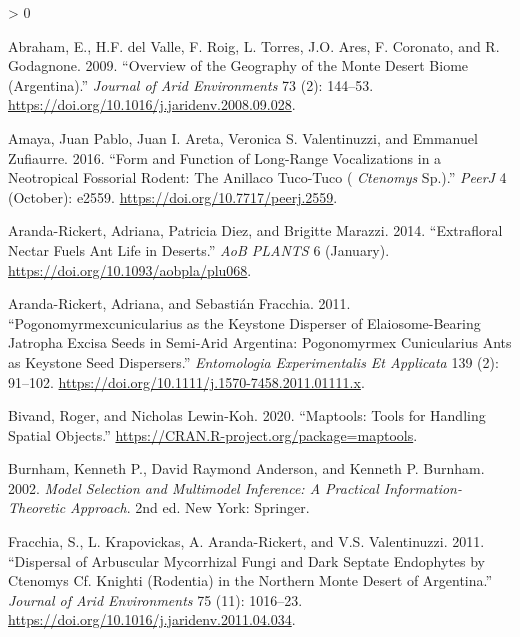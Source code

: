 \documentclass[english,msc,numbers,hidelinks]{coppe}
\newlength{\cslhangindent}
\newenvironment{CSLReferences}[2] %
 {%
  \setlength{\parindent}{0pt}
  \ifodd #1 \everypar{\setlength{\hangindent}{\cslhangindent}}\ignorespaces\fi
  \ifnum #2 > 0
  \setlength{\parskip}{#2\baselineskip}
  \fi
 }%
 {}
\begin{document}
  \noindent

  \setlength{\parindent}{-0.20in}
  \setlength{\leftskip}{0.20in}
  \setlength{\parskip}{8pt}

  \hypertarget{refs}{}
  \begin{CSLReferences}{1}{0}
  \leavevmode\hypertarget{ref-abraham2009}{}%
  Abraham, E., H.F. del Valle, F. Roig, L. Torres, J.O. Ares, F. Coronato, and R. Godagnone. 2009. {``Overview of the Geography of the Monte Desert Biome (Argentina).''} \emph{Journal of Arid Environments} 73 (2): 144--53. \url{https://doi.org/10.1016/j.jaridenv.2008.09.028}.

  \leavevmode\hypertarget{ref-amaya2016}{}%
  Amaya, Juan Pablo, Juan I. Areta, Veronica S. Valentinuzzi, and Emmanuel Zufiaurre. 2016. {``Form and Function of Long-Range Vocalizations in a Neotropical Fossorial Rodent: The Anillaco Tuco-Tuco ( {\emph{Ctenomys}} Sp.).''} \emph{PeerJ} 4 (October): e2559. \url{https://doi.org/10.7717/peerj.2559}.

  \leavevmode\hypertarget{ref-aranda-rickert2014}{}%
  Aranda-Rickert, Adriana, Patricia Diez, and Brigitte Marazzi. 2014. {``Extrafloral Nectar Fuels Ant Life in Deserts.''} \emph{AoB PLANTS} 6 (January). \url{https://doi.org/10.1093/aobpla/plu068}.

  \leavevmode\hypertarget{ref-aranda-rickert2011a}{}%
  Aranda-Rickert, Adriana, and Sebastián Fracchia. 2011. {``Pogonomyrmexcunicularius as the Keystone Disperser of Elaiosome-Bearing Jatropha Excisa Seeds in Semi-Arid Argentina: Pogonomyrmex Cunicularius Ants as Keystone Seed Dispersers.''} \emph{Entomologia Experimentalis Et Applicata} 139 (2): 91--102. \url{https://doi.org/10.1111/j.1570-7458.2011.01111.x}.

  \leavevmode\hypertarget{ref-bivand2020}{}%
  Bivand, Roger, and Nicholas Lewin-Koh. 2020. {``Maptools: Tools for Handling Spatial Objects.''} \url{https://CRAN.R-project.org/package=maptools}.

  \leavevmode\hypertarget{ref-burnham2002}{}%
  Burnham, Kenneth P., David Raymond Anderson, and Kenneth P. Burnham. 2002. \emph{Model Selection and Multimodel Inference: A Practical Information-Theoretic Approach}. 2nd ed. New York: Springer.

  \leavevmode\hypertarget{ref-fracchia2011}{}%
  Fracchia, S., L. Krapovickas, A. Aranda-Rickert, and V.S. Valentinuzzi. 2011. {``Dispersal of Arbuscular Mycorrhizal Fungi and Dark Septate Endophytes by Ctenomys Cf. Knighti (Rodentia) in the Northern Monte Desert of Argentina.''} \emph{Journal of Arid Environments} 75 (11): 1016--23. \url{https://doi.org/10.1016/j.jaridenv.2011.04.034}.


\end{CSLReferences}
\end{document}
